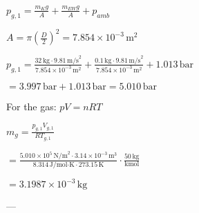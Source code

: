 \( p_{g,1} = \frac{m_{K} g}{A} + \frac{m_{EW} g}{A} + p_{amb} \)  

\( A = \pi \left(\frac{D}{2}\right)^2 = 7.854 \times 10^{-3} \, \text{m}^2 \)  

\( p_{g,1} = \frac{32 \, \text{kg} \cdot 9.81 \, \text{m/s}^2}{7.854 \times 10^{-3} \, \text{m}^2} + \frac{0.1 \, \text{kg} \cdot 9.81 \, \text{m/s}^2}{7.854 \times 10^{-3} \, \text{m}^2} + 1.013 \, \text{bar} \)  

\( = 3.997 \, \text{bar} + 1.013 \, \text{bar} = 5.010 \, \text{bar} \)  

For the gas:  
\( p V = n R T \)  

\( m_g = \frac{p_{g,1} V_{g,1}}{R T_{g,1}} \)  

\( = \frac{5.010 \times 10^5 \, \text{N/m}^2 \cdot 3.14 \times 10^{-3} \, \text{m}^3}{8.314 \, \text{J/mol·K} \cdot 273.15 \, \text{K}} \cdot \frac{50 \, \text{kg}}{\text{kmol}} \)  

\( = 3.1987 \times 10^{-3} \, \text{kg} \)  

---